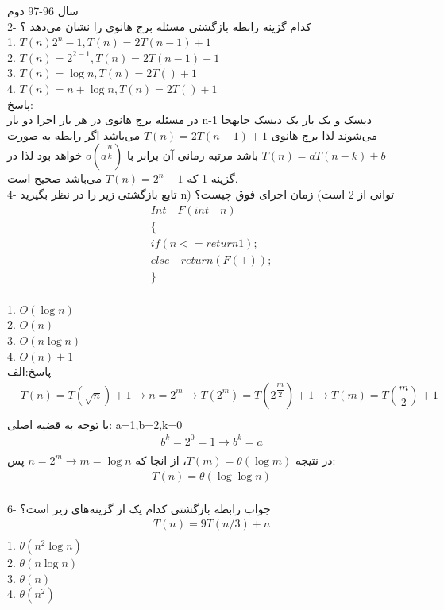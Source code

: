 \documentclass{book}
\begin{document}
سال 96-97 دوم\\

2- کدام گزینه رابطه بازگشتی مسئله برج هانوی را نشان می‌دهد ؟\\
1. $T(n)2^n -1,T(n)=2T(n-1)+1$\\
2.  $T(n)=2^{2-1},T(n)=2T(n-1)+1$\\
3.  $T(n)=\log n ,T(n)=2T()+1$\\
4.  $T(n)=n+\log n,T(n)=2T()+1$\\

پاسخ:\\
در مسئله برج هانوی در هر بار اجرا دو بار n-1 دیسک و یک بار یک دیسک جا‌بهجا می‌شوند لذا برج هانوی $T(n)=2T(n-1)+1$  می‌باشد اگر رابطه به صورت $T(n)=aT(n-k)+b$ باشد مرتبه زمانی آن برابر با $o(a^{\dfrac{n}{k}})$ خواهد بود لذا در گزینه 1 که $T(n)=2^n -1$ می‌باشد صحیح است.\\ 

4- تابع بازگشتی زیر را در نظر بگیرید n) توانی از 2 است) زمان اجرای فوق چیست؟\\
\begin{align*}
&Int \quad F(int\quad n )\\
&\{\\
&if (n<= return 1);\\
&else \quad return (F(+));\\
&\}\\
\end{align*}

1. $O(\log n)$\\
2.  $O(n)$\\
3. $O(n\log n)$ \\
4.  $O(n)+1$\\

پاسخ:الف 
\begin{align*}
&T(n)=T(\sqrt{n})+1 \to n=2^m \to T(2^m)=T(2^{\dfrac{m}{2}})+1 \to T(m)=T(\dfrac{m}{2})+1\\
\end{align*}
با توجه به قضیه اصلی: a=1,b=2,k=0 \\
\begin{align*}
&b^k=2^0=1\to b^k=a\\
\end{align*}
در نتیجه $T(m)=\theta (\log m)$، از انجا که $n=2^m \to m=\log n$ پس:
\begin{align*}
&T(n)=\theta (\log \log n)\\
\end{align*}


6- جواب رابطه بازگشتی کدام یک از گزینه‌های زیر است؟\\
\begin{align*}
&T(n)=9T(n/3)+n\\
\end{align*}
1. $\theta (n^2\log n)$ \\
2. $\theta (n\log n)$\\
3. $\theta (n)$\\
4. $\theta (n^2)$\\
\end{document}
